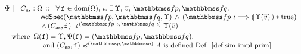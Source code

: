 
\begin{definition}
    \em
    \label{def:wdprim-sem}
    \small
    \[
        \begin{array}{l}
            \semWdPrim{\Cspec}{\asmimp}{\hprimset} 
            \, \define \, 
            \forall \, \lab{} \in \dom(\hprimset), \, 
            \lgvl. \ 
            \exists \, \hprim, \, \args{\val}, \,
            \relspecpre, \relspecpost.  \\
            \hspace*{5em}
            \wdSpec{\relspecpre}{\relspecpost} {\hprim} 
            	\, \land \, 
            	(\relspecpre \ \lgvl \Longrightarrow  
            	\safePrimAst{\, \hprim(\args{\val}) \,} 
                \sepstar \atrue) \\
            \hspace*{5em}
            \, \land \, 
            \simFunction{(\asmimp, \lab{})}
                {(\relspecpre \ \lgvl, \,
                    \relspecpost \ \lgvl)}
                {\hprim(\args{\val})}
            \\
            \\[-9pt]
            \hspace*{1em}
            \TYPE{where } \, 
            \hprimset(\lab{}) = \hprim, 
            \Cspec(\lab{}) = (\relspecpre, \relspecpost), \\
            \hspace*{5em}
            \TYPE{ and }
            \simFunction{(\asmimp, \lab{})}
                {(\relastP, \relastQ)}{\primcom}
            \TYPE{ is defined 
            \Def{\ref{def:sim-impl-prim}}}.
        \end{array}
\]
\end{definition}
